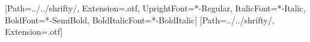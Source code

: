 \def\pfFontPath{../../shrifty/}
\usepackage{fontspec}
\usepackage{unicode-math}
\setmainfont{FiraSans}[Path=\pfFontPath, Extension=.otf,
  UprightFont=*-Regular, ItalicFont=*-Italic, BoldFont=*-SemiBold, BoldItalicFont=*-BoldItalic]
[Path=\pfFontPath, Extension=.otf]
\usepackage{stil/profig}
